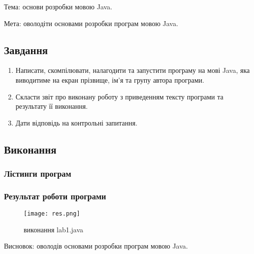 \documentclass[a4paper,14pt]{extarticle}
\begin{document}

%

\begin{test}{Тема:}
  основи розробки мовою Java.
\end{test}

\begin{test}{Мета:}
  оволодіти основами розробки програм мовою Java.
\end{test}

\subsection{Завдання}
\begin{enumerate}
  \item Написати, скомпілювати, налагодити та запустити програму на мові Java, яка виводитиме на екран прізвище, ім’я та групу автора програми.
  \item Скласти звіт про виконану роботу з приведенням тексту програми та результату її виконання.
  \item Дати відповідь на контрольні запитання.
\end{enumerate}



\subsection{Виконання}
\subsubsection{Лістинги програм}


\subsubsection{Результат роботи програми}
\begin{figure}[h]
    \centering
    \texttt{[image: res.png]}
    \caption{виконання lab1.java}
\end{figure}


\begin{test}{Висновок:}
  оволодів основами розробки програм мовою Java.
\end{test}
\end{document}
